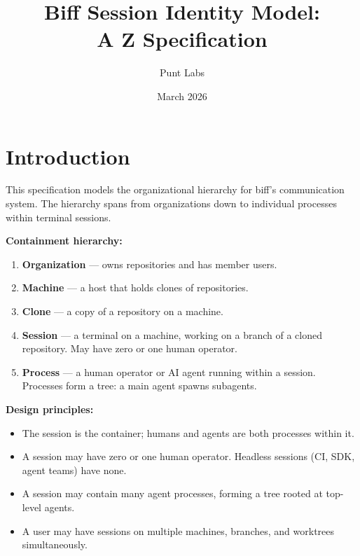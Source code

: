 \documentclass[a4paper,10pt,fleqn]{article}
\begin{document}
\title{Biff Session Identity Model:\\A Z Specification}
\author{Punt Labs}
\date{March 2026}
\maketitle

\tableofcontents
\newpage

\section{Introduction}

This specification models the organizational hierarchy for biff's
communication system.  The hierarchy spans from organizations down to
individual processes within terminal sessions.

\medskip
\noindent\textbf{Containment hierarchy:}

\begin{enumerate}
  \item \textbf{Organization} --- owns repositories and has member users.
  \item \textbf{Machine} --- a host that holds clones of repositories.
  \item \textbf{Clone} --- a copy of a repository on a machine.
  \item \textbf{Session} --- a terminal on a machine, working on a branch
    of a cloned repository.  May have zero or one human operator.
  \item \textbf{Process} --- a human operator or AI agent running within
    a session.  Processes form a tree: a main agent spawns subagents.
\end{enumerate}

\noindent\textbf{Design principles:}

\begin{itemize}
  \item The session is the container; humans and agents are both processes
    within it.
  \item A session may have zero or one human operator.  Headless sessions
    (CI, SDK, agent teams) have none.
  \item A session may contain many agent processes, forming a tree rooted
    at top-level agents.
  \item A user may have sessions on multiple machines, branches, and
    worktrees simultaneously.
\end{itemize}
\end{document}
